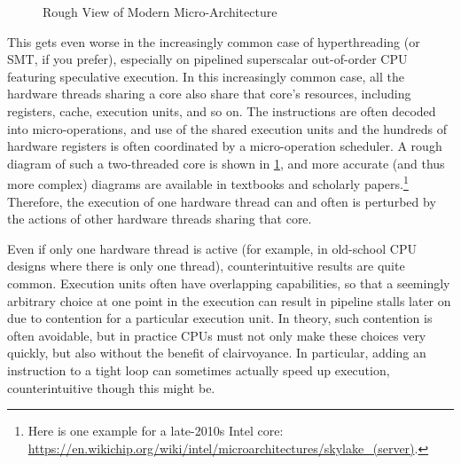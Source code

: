 \begin{figure}[tb]
\centering
{}
\caption{Rough View of Modern Micro-Architecture}
\label{fig:cpu:Rough View of Modern Micro-Architecture}
\end{figure}

This gets even worse in the increasingly common case of hyperthreading
(or SMT, if you prefer), especially on pipelined superscalar out-of-order
CPU featuring speculative execution.
In this increasingly common case, all the hardware threads sharing
a core also share that core's resources, including registers, cache,
execution units, and so on.
The instructions are often decoded into micro-operations, and use of the
shared execution units and the hundreds of hardware registers is often
coordinated by a micro-operation scheduler.
A rough diagram of such a two-threaded core is shown in
\cref{fig:cpu:Rough View of Modern Micro-Architecture},
and more accurate (and thus more complex) diagrams are available in
textbooks and scholarly papers.\footnote{
	Here is one example for a late-2010s Intel core:
	\url{https://en.wikichip.org/wiki/intel/microarchitectures/skylake_(server)}.}
Therefore, the execution of one hardware thread can and often is perturbed
by the actions of other hardware threads sharing that core.

Even if only one hardware thread is active (for example, in old-school
CPU designs where there is only one thread), counterintuitive results
are quite common.
Execution units often have overlapping capabilities, so that a seemingly
arbitrary choice at one point in the execution can result in pipeline
stalls later on due to contention for a particular execution unit.
In theory, such contention is often avoidable, but in practice CPUs must
not only make these choices very quickly, but also without the benefit
of clairvoyance.
In particular, adding an instruction to a tight loop can sometimes
actually speed up execution, counterintuitive though this might be.

